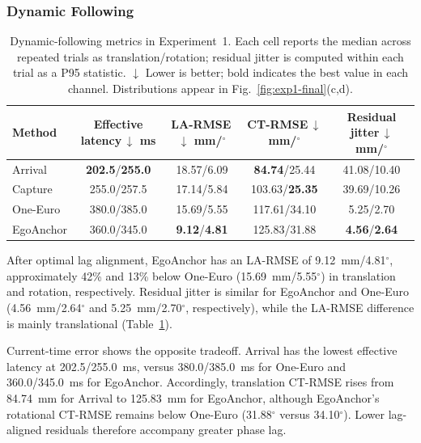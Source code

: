 \documentclass[review]{vgtc}
\begin{document}
\subsubsection{Dynamic Following}

\begin{table}[t]
\centering
\caption{Dynamic-following metrics in Experiment~1. Each cell reports the median across repeated trials as translation/rotation; residual jitter is computed within each trial as a P95 statistic. $\downarrow$ Lower is better; bold indicates the best value in each channel. Distributions appear in Fig.~\ref{fig:exp1-final}(c,d).}
\label{tab:exp1-dynamic}
\setlength{\tabcolsep}{2pt}
\begin{tabular}{@{}lcccc@{}}
\toprule
Method & \shortstack{Effective\\latency\,$\downarrow$\\ms} & \shortstack{LA-RMSE\,$\downarrow$\\mm/$^\circ$} & \shortstack{CT-RMSE\,$\downarrow$\\mm/$^\circ$} & \shortstack{Residual\\jitter\,$\downarrow$\\mm/$^\circ$} \\
\midrule
Arrival   & \textbf{202.5}/\textbf{255.0} & 18.57/6.09 & \textbf{84.74}/25.44 & 41.08/10.40 \\
Capture   & 255.0/257.5 & 17.14/5.84 & 103.63/\textbf{25.35} & 39.69/10.26 \\
One-Euro  & 380.0/385.0 & 15.69/5.55 & 117.61/34.10 & 5.25/2.70 \\
EgoAnchor & 360.0/345.0 & \textbf{9.12}/\textbf{4.81} & 125.83/31.88 & \textbf{4.56}/\textbf{2.64} \\
\bottomrule
\end{tabular}
\end{table}

After optimal lag alignment, EgoAnchor has an LA-RMSE of 9.12~mm/4.81$^\circ$, approximately 42\% and 13\% below One-Euro (15.69~mm/5.55$^\circ$) in translation and rotation, respectively. Residual jitter is similar for EgoAnchor and One-Euro (4.56~mm/2.64$^\circ$ and 5.25~mm/2.70$^\circ$, respectively), while the LA-RMSE difference is mainly translational (Table~\ref{tab:exp1-dynamic}).

Current-time error shows the opposite tradeoff. Arrival has the lowest effective latency at 202.5/255.0~ms, versus 380.0/385.0~ms for One-Euro and 360.0/345.0~ms for EgoAnchor. Accordingly, translation CT-RMSE rises from 84.74~mm for Arrival to 125.83~mm for EgoAnchor, although EgoAnchor's rotational CT-RMSE remains below One-Euro (31.88$^\circ$ versus 34.10$^\circ$). Lower lag-aligned residuals therefore accompany greater phase lag.
\end{document}
